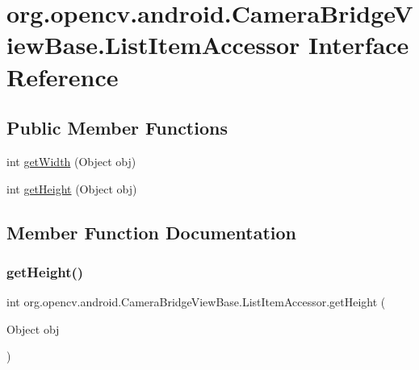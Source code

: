 \hypertarget{interfaceorg_1_1opencv_1_1android_1_1_camera_bridge_view_base_1_1_list_item_accessor}{}\section{org.\+opencv.\+android.\+Camera\+Bridge\+View\+Base.\+List\+Item\+Accessor Interface Reference}
\label{interfaceorg_1_1opencv_1_1android_1_1_camera_bridge_view_base_1_1_list_item_accessor}
\subsection*{Public Member Functions}
\begin{DoxyCompactItemize}
\item 
int \mbox{\hyperlink{interfaceorg_1_1opencv_1_1android_1_1_camera_bridge_view_base_1_1_list_item_accessor_a8fe2d5930e3392bcf90eb383e09f335b}{get\+Width}} (Object obj)
\item 
int \mbox{\hyperlink{interfaceorg_1_1opencv_1_1android_1_1_camera_bridge_view_base_1_1_list_item_accessor_a761727a23f227c5027f7537039fbec75}{get\+Height}} (Object obj)
\end{DoxyCompactItemize}


\subsection{Member Function Documentation}
\mbox{\label{interfaceorg_1_1opencv_1_1android_1_1_camera_bridge_view_base_1_1_list_item_accessor_a761727a23f227c5027f7537039fbec75}} 
\subsubsection{\texorpdfstring{get\+Height()}{getHeight()}}
{\footnotesize\ttfamily int org.\+opencv.\+android.\+Camera\+Bridge\+View\+Base.\+List\+Item\+Accessor.\+get\+Height (\begin{DoxyParamCaption}\item[{Object}]{obj }\end{DoxyParamCaption})}

